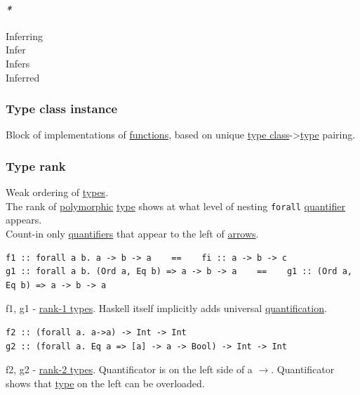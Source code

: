 \documentclass[11pt]{article}
\begin{document}
\paragraph{\emph{*}}
\label{sec:orga9bdba0}

\label{org0225832}Inferring\\
\label{org774bd97}Infer\\
\label{org7b6a854}Infers\\
\label{org76b4540}Inferred\\

\subsubsection{\label{orgb31808e}Type class instance}
\label{sec:orgb9fb17d}
Block of implementations of \hyperref[org66c5288]{functions}, based on unique \hyperref[orga4a5066]{type class}->\hyperref[org4fbaeb8]{type} pairing.\\

\subsubsection{\label{org8caa08c}Type rank}
\label{sec:org4d45c76}
Weak ordering of \hyperref[org3927fd9]{types}.\\

The rank of \hyperref[org84d7fee]{polymorphic} \hyperref[org4fbaeb8]{type} shows at what level of nesting \texttt{forall} \hyperref[org7158dde]{quantifier} appears.\\
Count-in only \hyperref[orga67c681]{quantifiers} that appear to the left of \hyperref[org33f3f3f]{arrows}.\\
\begin{verbatim}
f1 :: forall a b. a -> b -> a    ==    fi :: a -> b -> c
g1 :: forall a b. (Ord a, Eq b) => a -> b -> a    ==    g1 :: (Ord a, Eq b) => a -> b -> a
\end{verbatim}
f1, g1 - \hyperref[orgb8084b9]{rank-1 types}. Haskell itself implicitly adds universal \hyperref[org0e370df]{quantification}.\\

\begin{verbatim}
f2 :: (forall a. a->a) -> Int -> Int
g2 :: (forall a. Eq a => [a] -> a -> Bool) -> Int -> Int
\end{verbatim}
f2, g2 - \hyperref[org24f0bf7]{rank-2 types}. Quantificator is on the left side of a \(\to\). Quantificator shows that \hyperref[org4fbaeb8]{type} on the left can be overloaded.\\
\end{document}
